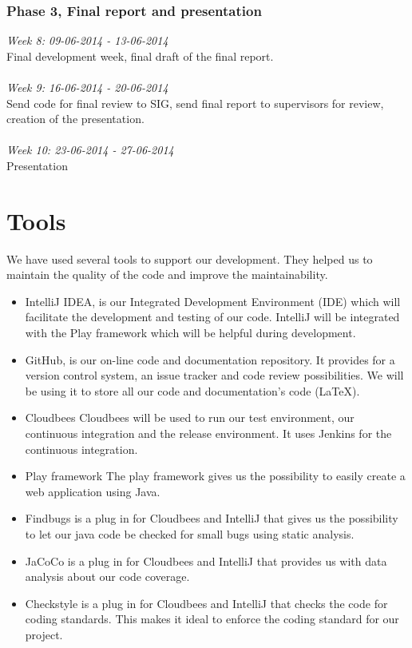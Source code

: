 \subsubsection{Phase 3, Final report and presentation}

\noindent\emph{Week 8: 09-06-2014 - 13-06-2014}\\
Final development week, final draft of the final report.
\\\\
\noindent\emph{Week 9: 16-06-2014 - 20-06-2014}\\
Send code for final review to SIG, send final report to supervisors for review, creation of the presentation.
\\\\
\noindent\emph{Week 10: 23-06-2014 - 27-06-2014}\\
Presentation

\section{Tools}
We have used several tools to support our development. They helped us to maintain the quality of the code and improve the maintainability. 

\begin{itemize}
\item IntelliJ IDEA, is our Integrated Development Environment (IDE) which will facilitate the development and testing of our code.
IntelliJ will be integrated with the Play framework which will be helpful during development.
\item GitHub, is our on-line code and documentation repository.
It provides for a version control system, an issue tracker and code review possibilities.
We will be using it to store all our code and documentation's code (LaTeX).
\item Cloudbees
Cloudbees will be used to run our test environment, our continuous integration and the release environment.
It uses Jenkins for the continuous integration.
\item Play framework
The play framework gives us the possibility to easily create a web application using Java.
\item Findbugs is a plug in for Cloudbees and IntelliJ that gives us the possibility to let our java code be checked for small bugs using static analysis.
\item JaCoCo is a plug in for Cloudbees and IntelliJ that provides us with data analysis about our code coverage.
\item Checkstyle is a plug in for Cloudbees and IntelliJ that checks the code for coding standards.
This makes it ideal to enforce the coding standard for our project.
\end{itemize}
